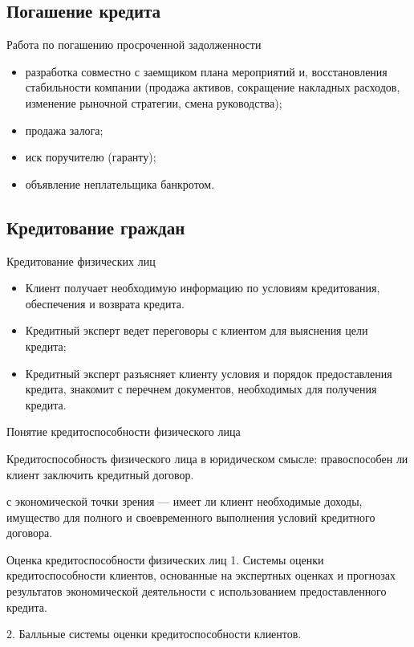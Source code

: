 \documentclass[_Banking_p2.tex]{subfiles}
\begin{document}
\subsection{Погашение кредита}
\begin{frame}{Работа по погашению просроченной задолженности}
\begin{itemize}
	\item разработка совместно с заемщиком плана
	мероприятий и, восстановления
	стабильности компании (продажа активов,
	сокращение накладных расходов, изменение
	рыночной стратегии, смена руководства);
	\item продажа залога;
	\item иск поручителю (гаранту);
	\item объявление неплательщика банкротом.
\end{itemize}
\end{frame}

\subsection{Кредитование граждан}
\begin{frame}{Кредитование физических лиц}
\begin{itemize}
	\item Клиент получает необходимую информацию
	по условиям кредитования, обеспечения и
	возврата кредита.
	\item Кредитный эксперт ведет переговоры с
	клиентом для выяснения цели кредита;
	\item Кредитный эксперт разъясняет клиенту
	условия и порядок предоставления кредита,
	знакомит с перечнем документов,
	необходимых для получения кредита.
\end{itemize}
\end{frame}

\begin{frame}{Понятие кредитоспособности физического лица}
\begin{block}{Кредитоспособность физического лица}
	\quad в юридическом смысле: правоспособен ли
	клиент заключить кредитный договор.
	
	\quad с экономической точки зрения — имеет ли
	клиент необходимые доходы, имущество для
	полного и своевременного выполнения условий
	кредитного договора.
\end{block}
\end{frame}
\begin{frame}{Оценка кредитоспособности физических лиц}
1. Системы оценки кредитоспособности клиентов,
основанные на экспертных оценках и прогнозах
результатов экономической деятельности с
использованием предоставленного кредита.

2. Балльные системы оценки кредитоспособности
клиентов.
\end{frame}
\end{document}
